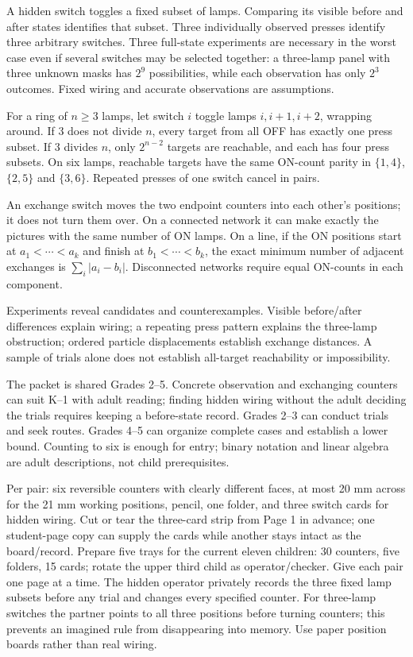 A hidden switch toggles a fixed subset of lamps. Comparing its visible before and after states identifies that subset. Three individually observed presses identify three arbitrary switches. Three full-state experiments are necessary in the worst case even if several switches may be selected together: a three-lamp panel with three unknown masks has $2^9$ possibilities, while each observation has only $2^3$ outcomes. Fixed wiring and accurate observations are assumptions.

For a ring of $n\ge 3$ lamps, let switch $i$ toggle lamps $i,i+1,i+2$, wrapping around. If $3$ does not divide $n$, every target from all OFF has exactly one press subset. If $3$ divides $n$, only $2^{n-2}$ targets are reachable, and each has four press subsets. On six lamps, reachable targets have the same ON-count parity in $\{1,4\}$, $\{2,5\}$ and $\{3,6\}$. Repeated presses of one switch cancel in pairs.

An exchange switch moves the two endpoint counters into each other's positions; it does not turn them over. On a connected network it can make exactly the pictures with the same number of ON lamps. On a line, if the ON positions start at $a_1<\cdots<a_k$ and finish at $b_1<\cdots<b_k$, the exact minimum number of adjacent exchanges is $\sum_i|a_i-b_i|$. Disconnected networks require equal ON-counts in each component.

Experiments reveal candidates and counterexamples. Visible before/after differences explain wiring; a repeating press pattern explains the three-lamp obstruction; ordered particle displacements establish exchange distances. A sample of trials alone does not establish all-target reachability or impossibility.

The packet is shared Grades 2--5. Concrete observation and exchanging counters can suit K--1 with adult reading; finding hidden wiring without the adult deciding the trials requires keeping a before-state record. Grades 2--3 can conduct trials and seek routes. Grades 4--5 can organize complete cases and establish a lower bound. Counting to six is enough for entry; binary notation and linear algebra are adult descriptions, not child prerequisites.

Per pair: six reversible counters with clearly different faces, at most 20 mm across for the 21 mm working positions, pencil, one folder, and three switch cards for hidden wiring. Cut or tear the three-card strip from Page 1 in advance; one student-page copy can supply the cards while another stays intact as the board/record. Prepare five trays for the current eleven children: 30 counters, five folders, 15 cards; rotate the upper third child as operator/checker. Give each pair one page at a time. The hidden operator privately records the three fixed lamp subsets before any trial and changes every specified counter. For three-lamp switches the partner points to all three positions before turning counters; this prevents an imagined rule from disappearing into memory. Use paper position boards rather than real wiring.

